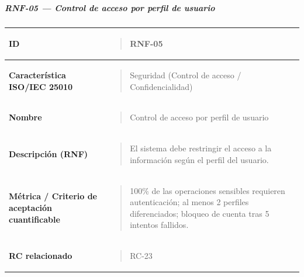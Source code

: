 \documentclass[
]{article}
\newcounter{none} %
\begin{document}
\subparagraph{RNF-05 --- Control de acceso por perfil de
usuario}\label{rnf-05-control-de-acceso-por-perfil-de-usuario}

{\def\LTcaptype{none} %
\begin{longtable}[]{@{}
  >{\raggedright\arraybackslash}p{}
  >{\raggedright\arraybackslash}p{}@{}}
\toprule\noalign{}
\begin{minipage}[b]{\linewidth}\raggedright
\textbf{ID}
\end{minipage} & \begin{minipage}[b]{\linewidth}\raggedright
\begin{quote}
RNF-05
\end{quote}
\end{minipage} \\
\midrule\noalign{}
\endhead
\bottomrule\noalign{}
\endlastfoot
\textbf{Característica ISO/IEC 25010} & \begin{minipage}[t]{\linewidth}\raggedright
\begin{quote}
Seguridad (Control de acceso / Confidencialidad)
\end{quote}
\end{minipage} \\
\textbf{Nombre} & \begin{minipage}[t]{\linewidth}\raggedright
\begin{quote}
Control de acceso por perfil de usuario
\end{quote}
\end{minipage} \\
\textbf{Descripción (RNF)} & \begin{minipage}[t]{\linewidth}\raggedright
\begin{quote}
El sistema debe restringir el acceso a la información según el perfil
del usuario.
\end{quote}
\end{minipage} \\
\textbf{Métrica / Criterio de aceptación cuantificable} & \begin{minipage}[t]{\linewidth}\raggedright
\begin{quote}
100\% de las operaciones sensibles requieren autenticación; al menos 2
perfiles diferenciados; bloqueo de cuenta tras 5 intentos fallidos.
\end{quote}
\end{minipage} \\
\textbf{RC relacionado} & \begin{minipage}[t]{\linewidth}\raggedright
\begin{quote}
RC-23
\end{quote}
\end{minipage} \\
\end{longtable}
}
\end{document}
